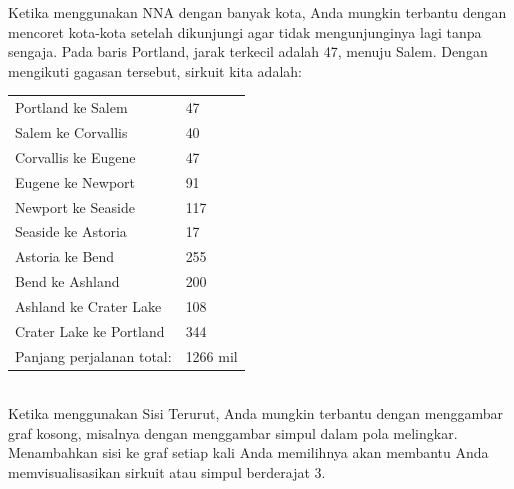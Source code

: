 \begin{example}{}
\noindent Ketika menggunakan NNA dengan banyak kota, Anda mungkin terbantu dengan mencoret kota-kota setelah dikunjungi agar tidak mengunjunginya lagi tanpa sengaja.  Pada baris Portland, jarak terkecil adalah 47, menuju Salem.  Dengan mengikuti gagasan tersebut, sirkuit kita adalah:\\
\begin{minipage}{0.5\textwidth}
\begin{tabular}{ll}
Portland ke Salem&		47\\
Salem ke Corvallis&		40\\
Corvallis ke Eugene&		47\\
Eugene ke Newport	&	91\\
Newport ke Seaside	&	117\\
Seaside ke Astoria	&	17\\
Astoria ke Bend		&255\\
Bend ke Ashland	&	200\\
Ashland ke Crater Lake&	108\\
Crater Lake ke Portland&	344\\
Panjang perjalanan total:		&1266 mil\\
\end{tabular}\\

Ketika menggunakan Sisi Terurut, Anda mungkin terbantu dengan menggambar graf kosong, misalnya dengan menggambar simpul dalam pola melingkar.  Menambahkan sisi ke graf setiap kali Anda memilihnya akan membantu Anda memvisualisasikan sirkuit atau simpul berderajat 3.\\
\end{minipage}
%
\begin{minipage}{0.5\textwidth}
\vspace{0.5in}
\end{minipage}


\end{example}
